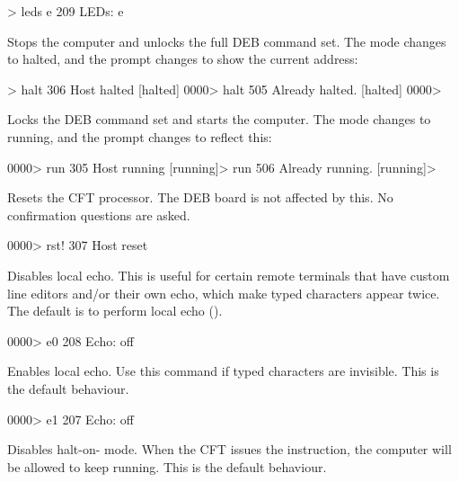 \begin{description}
\begin{debcode}
[running]> leds e
209 LEDs: e
\end{debcode}

\item{\bfseries{}} Stops the computer and unlocks the full \gls{DEB}
  command set. The mode changes to halted, and the prompt changes to
  show the current address:

\begin{debcode}
[running]> halt
306 Host halted
[halted] 0000> halt
505 Already halted.
[halted] 0000> 
\end{debcode}


\item{\bfseries{}} Locks the \gls{DEB} command set and starts the
  computer.  The mode changes to running, and the prompt changes to
  reflect this:

\begin{debcode}
[halted] 0000> run
305 Host running
[running]> run
506 Already running.
[running]> 
\end{debcode}


\item{\bfseries{}} Resets the CFT processor. The \gls{DEB} board is
  not affected by this. No confirmation questions are asked.

\begin{debcode}
[halted] 0000> rst!
307 Host reset
\end{debcode}


\item{\bfseries{}} Disables local echo. This is useful for certain
  remote terminals that have custom line editors and/or their own
  echo, which make typed characters appear twice. The default is to
  perform local echo ().

\begin{debcode}
[halted] 0000> e0
208 Echo: off
\end{debcode}


\item{\bfseries{}} Enables local echo. Use this command if typed
  characters are invisible. This is the default behaviour.

\begin{debcode}
[halted] 0000> e1
207 Echo: off
\end{debcode}


\item{\bfseries{}} Disables halt-on- mode. When the CFT
  issues the  instruction, the computer will be allowed to
  keep running. This is the default behaviour.


\end{description}
